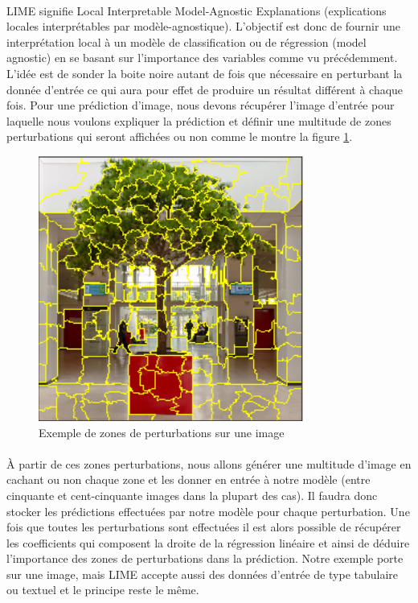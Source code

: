 \paragraph{}LIME signifie Local Interpretable Model-Agnostic Explanations (explications locales interprétables par modèle-agnostique). L'objectif est donc de fournir une interprétation local à un modèle de classification ou de régression (model agnostic) en se basant sur l’importance des variables comme vu précédemment. L'idée est de sonder la boite noire autant de fois que nécessaire en perturbant la donnée d'entrée ce qui aura pour effet de produire un résultat différent à chaque fois. Pour une prédiction d'image, nous devons récupérer l'image d'entrée pour laquelle nous voulons expliquer la prédiction et définir une multitude de zones perturbations qui seront affichées ou non comme le montre la figure \ref{perturbationExemple}.
\begin{figure}[h]
\centering
\includegraphics[scale=0.6]{src_img/perturbationExemple.png}
\caption{Exemple de zones de perturbations sur une image}
\label{perturbationExemple}
\end{figure}
\paragraph{}À partir de ces zones perturbations, nous allons générer une multitude d'image en cachant ou non chaque zone et les donner en entrée à notre modèle (entre cinquante et cent-cinquante images dans la plupart des cas). Il faudra donc stocker les prédictions effectuées par notre modèle pour chaque perturbation. Une fois que toutes les perturbations sont effectuées il est alors possible de récupérer les coefficients qui composent la droite de la régression linéaire et ainsi de déduire l'importance des zones de perturbations dans la prédiction. Notre exemple porte sur une image, mais LIME accepte aussi des données d'entrée de type tabulaire ou textuel et le principe reste le même.

